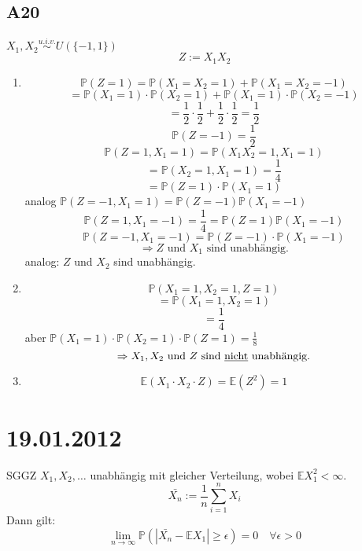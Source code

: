 \documentclass[a4paper,11pt,notitlepage]{report}
\newcommand{\Prim}{{\ensuremath{\mathbb{P}}}}
\newcommand{\E}{{\ensuremath{\mathbb{E}}}}
\begin{document}
\section{A20}
$X_1, X_2 \overset{u.i.v.}{\sim} U(\{-1,1\})$
$$Z:= X_1 X_2$$
\begin{enumerate}
	\item $$\Prim(Z=1) = \Prim(X_1 = X_2 = 1) + \Prim (X_1 = X_2 = -1)$$
	$$= \Prim(X_1 = 1) \cdot \Prim(X_2 = 1) + \Prim(X_1 = 1) \cdot \Prim(X_2 = -1)$$
	$$= \frac{1}{2} \cdot \frac{1}{2} + \frac{1}{2} \cdot \frac{1}{2} = \frac{1}{2}$$
	$$\Prim(Z=-1) = \frac{1}{2}$$
	$$\Prim(Z=1, X_1 = 1) = \Prim(X_1 X_2 = 1, X_1 = 1)$$
	$$= \Prim(X_2 = 1, X_1 = 1) = \frac{1}{4}$$
	$$= \Prim(Z=1) \cdot \Prim(X_1 = 1)$$
	analog $\Prim(Z=-1, X_1 = 1) = \Prim(Z = -1) \Prim(X_1 = -1)$
	$$\Prim(Z=1, X_1 = -1) = \frac{1}{4} = \Prim(Z=1) \Prim( X_1 = -1)$$
	$$\Prim(Z=-1, X_1 = -1) = \Prim(Z=-1) \cdot \Prim(X_1 = -1)$$
	$$\Rightarrow Z \text{ und } X_1 \text{ sind unabhängig.}$$
	analog: $Z$ und $X_2$ sind unabhängig.
	\item $$\Prim(X_1 = 1, X_2 = 1, Z=1)$$
	$$= \Prim(X_1 = 1, X_2 = 1)$$
	$$= \frac{1}{4}$$
	aber $\Prim(X_1 = 1) \cdot \Prim(X_2 = 1) \cdot \Prim(Z=1) = \frac{1}{8}$
	$$\Rightarrow X_1, X_2 \text{ und } Z \text{ sind \underline{nicht} unabhängig.}$$
	\item $$\E(X_1 \cdot X_ 2\cdot Z)= \E (Z^2) = 1$$
\end{enumerate}

\chapter{19.01.2012}
SGGZ
\newline
$X_1, X_2, \ldots$ unabhängig mit gleicher Verteilung, wobei $\E X_1^2 < \infty$.
$$\bar{X_n}:= \frac{1}{n} \sum\limits_{i=1}^{n}{X_i}$$
Dann gilt:
$$\lim\limits_{n \rightarrow \infty}{\Prim(|\bar{X_n}-\E X_1| \geq \epsilon)} = 0 \quad \forall \epsilon > 0$$
\end{document}
